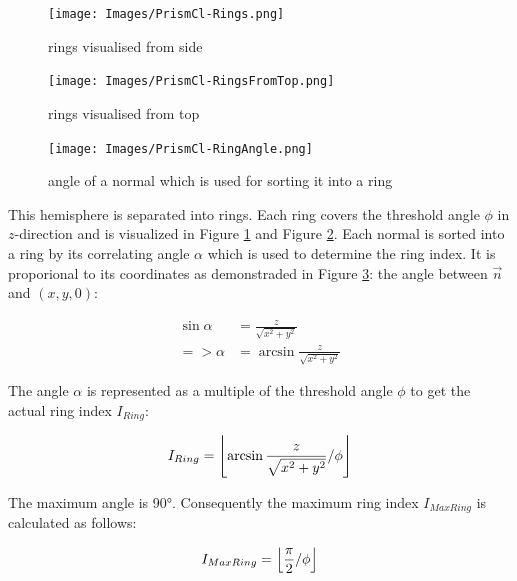 \documentclass[../ClassicThesis.tex]{subfiles}
\begin{document}
\begin{figure}
    \texttt{[image: Images/PrismCl-Rings.png]}
    \caption{rings visualised from side}
    \label{fig:rings_FromSide}
\end{figure}

\begin{figure}
    \texttt{[image: Images/PrismCl-RingsFromTop.png]}
    \caption{rings visualised from top}
    \label{fig:rings_FromTop}
\end{figure}

\begin{figure}
    \texttt{[image: Images/PrismCl-RingAngle.png]}
    \caption{angle of a normal which is used for sorting it into a ring}
    \label{fig:ringAngle}
\end{figure}


This hemisphere is separated into rings. Each ring covers the threshold angle $\phi$ in $z$-direction and is visualized in Figure \ref{fig:rings_FromSide} and Figure \ref{fig:rings_FromTop}. Each normal is sorted into a ring by its correlating angle $\alpha$ which is used to determine the ring index. It is proporional to its coordinates as demonstraded in Figure \ref{fig:ringAngle}: the angle between $\vec{n}$ and $(x,y,0)$:

\begin{equation*}
\begin{split}
    \sin{\alpha} & = \frac{z}{ \sqrt{x^{2} + y^{2}} } \\
    => \alpha  & = \arcsin{ \frac{z}{ \sqrt{x^{2} + y^{2}} } }
\end{split}
\end{equation*}


The angle $\alpha$ is represented as a multiple of the threshold angle $\phi$ to get the actual ring index $I_{Ring}$:

\begin{equation*}
    I_{Ring} = \floor*{
                    \arcsin{
                        \frac{z}{ \sqrt{ x^{2} + y^{2} } }
                    }
                    / \phi
                }
\end{equation*}

The maximum angle is 90°. Consequently the maximum ring index $I_{MaxRing}$ is calculated as follows:

\begin{equation*}
    I_{MaxRing} = \floor*{
                    \frac{\pi}{2}
                    / \phi
                  }
\end{equation*}
\end{document}
